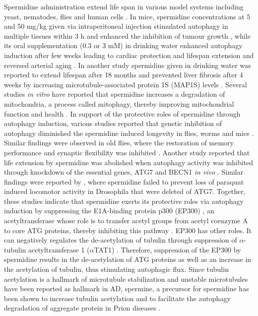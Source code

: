 Spermidine administration extend life span in various model systems including yeast, nematodes, flies \citep{Eisenberg2009,Minois2012,Morselli2011} and human cells \citep{Eisenberg2009,Garcia-Prat2016,Morselli2011,Pietrocola2015}. In mice, spermidine concentrations at 5 and 50 mg/kg given via intraperitoneal injection stimulated autophagy in multiple tissues within 3 h \citep{Morselli2011,Pucciarelli2012} and enhanced the inhibition of tumour growth \citep{Pietrocola2016}, while its oral supplementation (0.3 or  3 mM) in drinking water enhanced autophagy induction after few weeks leading to cardiac protection and lifespan extension \citep{Eisenberg2016a,Eisenberg2016b} and reversed arterial aging \citep{LaRocca2013}. In another study spermidine given in drinking water was reported to extend lifespan after 18 months and prevented liver fibrosis after 4 weeks by increasing microtubule-associated protein 1S (MAP1S) levels \citep{Yue2017}. Several studies \textit{in vitro} have reported that spermidine increases a degradation of mitochondria, a process called mitophagy, thereby improving mitochondrial function and health \citep{Eisenberg2016a,Eisenberg2016b,Fan2017,Garcia-Prat2016,Qi2016}. In support of the protective roles of spermidine through autophagy induction, various studies reported that genetic inhibition of autophagy diminished the spermidine induced longevity in flies, worms \citep{Eisenberg2009} and mice \citep{Yue2017}. Similar findings were observed in old flies, where the restoration of memory performance and synaptic flexibility was inhibited \citep{Gupta2013,Gupta2016}. Another study reported that life extension by spermidine was abolished when autophagy activity was inhibited through knockdown of the essential genes, ATG7 and BECN1 \textit{in vivo} \citep{He2013}. Similar findings were reported by \citet{Minois2012}, where spermidine failed to prevent loss of paraquat induced locomotor activity in Drosophila that were deleted of ATG7. Together, these studies indicate that spermidine exerts its protective roles via autophagy induction by suppressing the E1A-binding protein p300 (EP300) \citep{Pietrocola2015}, an acetyltransferase whose role is to transfer acetyl groups from acetyl coenzyme A to core ATG proteins, thereby inhibiting this pathway \citep{Eisenberg2014,Lee2009,Sebti2014}. EP300 has other roles. It can negatively regulates the de-acetylation of tubulin through suppression of $\alpha$-tubulin acetyltransferase 1 ($\alpha$TAT1) \citep{Mackeh2014}. Therefore, suppression of the EP300 by spermidine results in the de-acetylation of ATG proteins as well as an  increase in the acetylation of tubulin, thus stimulating autophagic flux. Since tubulin acetylation is a hallmark of microtubule stabilization and unstable microtubules have been reported as hallmark in AD, spermine, a precursor for spermidine has been shown to increase tubulin acetylation and to facilitate the autophagy  degradation of aggregate protein in Prion diseases \citep{Phadwal2018}.

